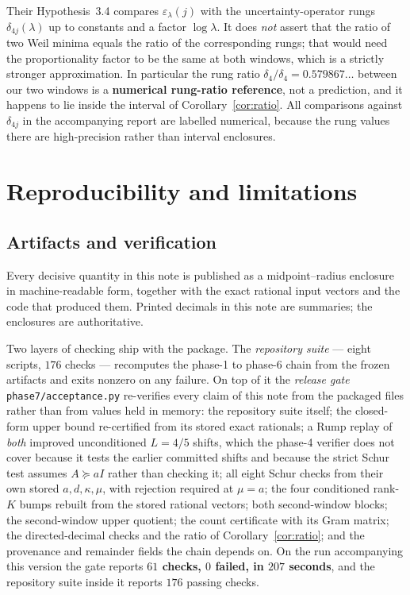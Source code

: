 \documentclass[11pt,a4paper]{article}
\theoremstyle{definition}
\theoremstyle{remark}
\newcommand{\src}[1]{{\footnotesize\texttt{#1}}}
\begin{document}
Their Hypothesis~3.4 compares $\varepsilon_\lambda(j)$ with the
uncertainty-operator rungs $\delta_{4j}(\lambda)$ up to constants and a factor
$\log\lambda$. It does \emph{not} assert that the ratio of two Weil minima
equals the ratio of the corresponding rungs; that would need the proportionality
factor to be the same at both windows, which is a strictly stronger
approximation. In particular the rung ratio
$\delta_4/\delta_4 = 0.579867\ldots$ between our two windows is a
\textbf{numerical rung-ratio reference}, not a prediction, and it happens to lie
inside the interval of Corollary~\ref{cor:ratio}. All comparisons against
$\delta_{4j}$ in the accompanying report are labelled numerical, because the
rung values there are high-precision rather than interval enclosures.

\section{Reproducibility and limitations}
\label{sec:repro}

\subsection{Artifacts and verification}

Every decisive quantity in this note is published as a midpoint--radius
enclosure in machine-readable form, together with the exact rational input
vectors and the code that produced them. Printed decimals in this note are
summaries; the enclosures are authoritative.

Two layers of checking ship with the package. The \emph{repository suite} ---
eight scripts, $176$ checks --- recomputes the phase-1 to phase-6 chain from the
frozen artifacts and exits nonzero on any failure. On top of it the
\emph{release gate} \src{phase7/acceptance.py} re-verifies every claim of this
note from the packaged files rather than from values held in memory: the
repository suite itself; the closed-form upper bound re-certified from its
stored exact rationals; a Rump replay of \emph{both} improved unconditioned
$L = 4/5$ shifts, which the phase-4 verifier does not cover because it tests the
earlier committed shifts and because the strict Schur test assumes $A \succeq aI$
rather than checking it; all eight Schur checks from their own stored
$a, d, \kappa, \mu$, with rejection required at $\mu = a$; the four conditioned
rank-$K$ bumps rebuilt from the stored rational vectors; both second-window
blocks; the second-window upper quotient; the count certificate with its Gram
matrix; the directed-decimal checks and the ratio of
Corollary~\ref{cor:ratio}; and the provenance and remainder fields the chain
depends on. On the run accompanying this version the gate reports
\textbf{$61$ checks, $0$ failed, in $207$ seconds}, and the repository suite
inside it reports $176$ passing checks.
\end{document}
